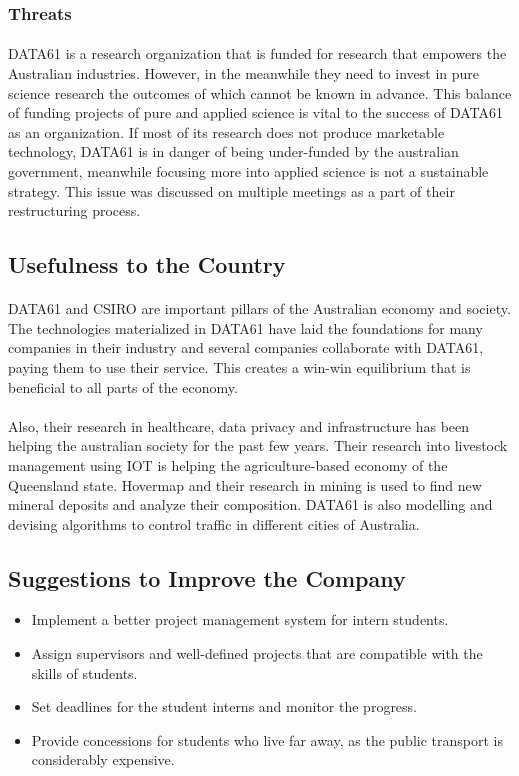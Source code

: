 \subsubsection*{Threats}
\paragraph{}
DATA61 is a research organization that is funded for research that empowers the Australian industries. However, in the meanwhile they need to invest in pure science research the outcomes of which cannot be known in advance. This balance of funding projects of pure and applied science is vital to the success of DATA61 as an organization. If most of its research does not produce marketable technology, DATA61 is in danger of being under-funded by the australian government, meanwhile focusing more into applied science is not a sustainable strategy. This issue was discussed on multiple meetings as a part of their restructuring process.


\subsection{Usefulness to the Country}
\paragraph{}
DATA61 and CSIRO are important pillars of the Australian economy and society. The technologies materialized in DATA61 have laid the foundations for many companies in their industry and several companies collaborate with DATA61, paying them to use their service. This creates a win-win equilibrium that is beneficial to all parts of the economy.

\paragraph{}
Also, their research in healthcare, data privacy and infrastructure has been helping the australian society for the past few years. Their research into livestock management using IOT is helping the agriculture-based economy of the Queensland state. Hovermap and their research in mining is used to find new mineral deposits and analyze their composition. DATA61 is also modelling and devising algorithms to control traffic in different cities of Australia. 

\subsection{Suggestions to Improve the Company}
\begin{itemize}
    \item Implement a better project management system for intern students.
    \item Assign supervisors and well-defined projects that are compatible with the skills of students.
    \item Set deadlines for the student interns and monitor the progress.
    \item Provide concessions for students who live far away, as the public transport is considerably expensive.
\end{itemize}